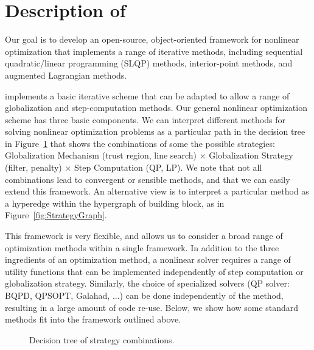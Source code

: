 \section{Description of \solvername{}}\label{S:description}

Our goal is to develop an open-source, object-oriented framework for nonlinear optimization that
implements a range of iterative methods, including sequential quadratic/linear programming (SLQP) methods,
interior-point methods, and augmented Lagrangian methods.

\solvername{} implements a basic iterative scheme that can be adapted to allow a range of globalization and
step-computation methods. Our general nonlinear optimization scheme has three basic components.
We can interpret different methods for solving nonlinear optimization problems as a particular
path in the decision tree in Figure~\ref{fig:combination-tree} that shows the combinations of
some the possible strategies: Globalization Mechanism (trust region, line search) $\times$ Globalization Strategy
(filter, penalty) $\times$ Step Computation (QP, LP). We note that not all combinations lead to convergent
or sensible methods, and that we can easily extend this framework. An alternative view is to
interpret a particular method as a hyperedge within the hypergraph of building block, as
in Figure~\ref{fig:StrategyGraph}.

This framework is very flexible, and allows us to consider a broad range of optimization methods
within a single framework. In addition to the three ingredients of an optimization method, a nonlinear solver requires a
range of utility functions  that can be implemented independently of step computation or globalization
strategy. Similarly, the choice of specialized solvers (QP solver: BQPD, QPSOPT, Galahad, ...)
can be done independently of the method, resulting in a large amount of code re-use. Below, we show how
some standard methods fit into the framework outlined above.

\begin{figure}[h!]
\centering

\caption{Decision tree of strategy combinations.}
\label{fig:combination-tree}
\end{figure}


